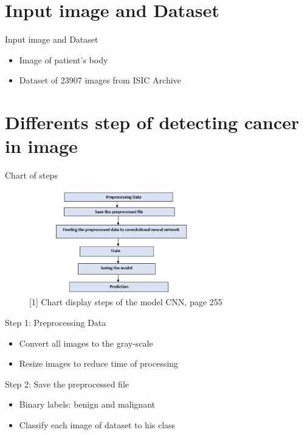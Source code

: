 \documentclass{beamer}
\begin{document}
\section{Input image and Dataset}
\begin{frame}{Input image and Dataset}
\begin{itemize}
		\item Image of patient's body
		\item Dataset of 23907 images from ISIC Archive
\end{itemize}
\end{frame} 
\section{Differents step of detecting cancer in image} 
\begin{frame}{Chart of steps}
\begin{figure}[H]
    \includegraphics[width=8cm,height=4.5cm]{images/steps.png}
    \caption{[1] Chart display steps of the model CNN, page 255}
    \label{fig:L1}
\end{figure}
\end{frame} 
\begin{frame}{Step 1: Preprocessing Data}
\begin{itemize}
		\item Convert all images to the gray-scale
		\item Resize images to reduce time of processing
\end{itemize}
\end{frame} 

\begin{frame}{Step 2: Save the preprocessed file}
\begin{itemize}
		\item  Binary labels: benign and malignant
		\item Classify each image of dataset to his class
\end{itemize}
\end{frame} 
\end{document}
